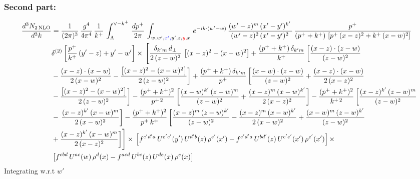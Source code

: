 \documentclass[9pt]{article}
\numberwithin{equation}{section}
\begin{document}
\subsubsection{Second part:\,}
\begin{align}
    \frac{d^{3}N_{2\,\rm NLO}}{d^{3}k} & =  \frac{1}{(2\pi)^{3}}\,\frac{g^{4}}{4\pi^{4}}\, \frac{1}{k^{+}}\,\int_{\Lambda}^{\vee-k^{+}}\, \frac{dp^{+}}{2\pi}\, \int_{w,w',{\color{blue}x',}y',z,{\color{red}y,}x}\, e^{-ik\cdot (w'-w)}\, \frac{(w'-z)^{m}\,(x'-y')^{k'}\,}{(w'-z)^{2}\,(x'-y')^{2}\,}\, \frac{p^{+}}{(p^{+}+k^{+})\,\left[p^{+}\,(x-z)^{2}+k^{+}\,(x-w)^{2}\right]}\notag \\ & \delta^{(2)}\left[\frac{p^{+}}{k^{+}}\, (y'-z)+y'-w'\right]\times\, \Bigg[\frac{\delta_{k'm}\,d_{\perp}}{2\,(z-w)^{2}}\, \left[(x-z)^{2}-(x-w)^{2}\right]+\frac{(p^{+}+k^{+})\,\delta_{k'm}}{k^{+}}\,\bigg[\frac{(x-z)\cdot (z-w)}{(z-w)^{2}}\notag \\ & -\frac{(x-z)\cdot (x-w)}{2\,(x-w)^{2}}-\frac{\left[(x-z)^{2}-(x-w)^{2}\right]}{2\,(z-w)^{2}}\bigg]+\frac{(p^{+}+k^{+})\,\delta_{k'm}}{p^{+}}\,\bigg[\frac{(x-w)\cdot (z-w)}{(z-w)^{2}}+\frac{(x-z)\cdot (x-w)}{2\,(x-z)^{2}}\notag \\ & -\frac{\left[(x-z)^{2}-(x-w)^{2}\right]}{2\,(z-w)^{2}}\bigg]-\frac{(p^{+}+k^{+})^{2}}{p^{+\,2}}\,\bigg[\frac{(x-w)^{k'}\,(z-w)^{m}}{(z-w)^{2}}+\frac{(x-z)^{m}\,(x-w)^{k'}}{2\,(x-z)^{2}}\bigg]-\frac{(p^{+}+k^{+})^{2}}{k^{+\,2}}\,\bigg[\frac{(x-z)^{k'}\,(z-w)^{m}}{(z-w)^{2}}\notag \\ & -\,\frac{(x-z)^{k'}\,(x-w)^{m}}{2\,(x-w)^{2}}\bigg]-\frac{(p^{+}+k^{+})^{2}}{p^{+}\,k^{+}}\,\bigg[\frac{(x-z)^{m}\,(z-w)^{k'}}{(z-w)^{2}}-\frac{(x-z)^{m}\,(x-w)^{k'}}{2\,(x-w)^{2}}+\frac{(x-w)^{m}\,(z-w)^{k'}}{(z-w)^{2}}\notag \\ & +\frac{(x-z)^{k'}\,(x-w)^{m}}{2\,(x-z)^{2}}\bigg]\Bigg]\times\,\left[f^{c'd'a}\,U^{e'c'}(y')\,U^{d'b}(z)\,\rho^{e'}(x')-f^{c'd'a}\, 
    U^{bd'}(z)\,U^{c'e'}(x')\,\rho^{e'}(x')\right]\times \notag \\ & \left[f^{cbd}\,U^{ac}(w)\,\rho^{d}(x) -f^{acd}\,U^{bc}(z)\,U^{de}(x)\,\rho^{e}(x)\right]
\end{align}
Integrating w.r.t $w'$
\end{document}
